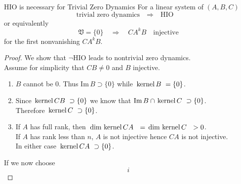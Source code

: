 \begin{proposition}{HIO is necessary for Trivial Zero Dynamics}{}
	For a linear system of $(A,B,C)$ 
	\begin{equation}
	\text{trivial zero dynamics} \quad \Rightarrow \quad \text{HIO} \quad
	\end{equation}	
	or equivalently
	\begin{equation}
	\mathfrak{V} = \{0\} \quad \Rightarrow \quad CA^kB\quad \text{injective}
	\end{equation}
	for the first nonvanishing $CA^kB$.
\end{proposition}
\begin{proof}
	We show that $\neg$HIO leads to nontrivial zero dynamics.\\
	Assume for simplicity that $CB \neq 0$ and $B$ injective. 
	\begin{enumerate}
	\item $B$ cannot be $0$. Thus $\text{Im}\,B\supset \{0\}$ while $ \, \text{kernel}\,B \,\,=\{0\}$. 
	\item Since $ \, \text{kernel}\,CB \,\,\supset
	\{0\}$ we know that $\text{Im}\, B \cap  \, \text{kernel}\,C \,\,\supset \{0\}$. \\
	Therefore $ \, \text{kernel}\,C \,\,\supset \{0\}$.
	\item If $A$ has full rank, then $ \, \text{dim}\, \, \text{kernel}\,CA \,\,  \,\,= \, \text{dim}\, \, \text{kernel}\,C \,\, \,\,>0$.\\
	If $A$ has rank less than $n$, $A$ is not injective hence $CA$ is not 
	injective. \\
	In either case $ \, \text{kernel}\,CA \,\,\supset \{0\}$. 
\end{enumerate}		
	If we now choose
	\begin{equation}
	i
	\end{equation}
	
\end{proof}